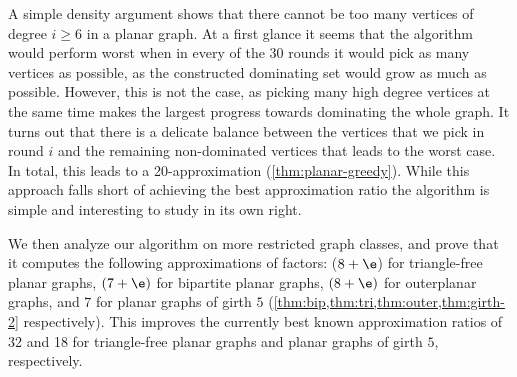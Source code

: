 A simple density argument shows
that there cannot be too many vertices of degree $i\geq 6$ in a planar
graph. At a first glance it seems that the algorithm would perform worst
when in every of the $30$ rounds it would pick as many vertices as possible,
as the constructed dominating set would grow as much as possible. However,
this is not the case, as picking many high degree vertices at the same time makes
the largest progress towards dominating the whole graph. It turns
out that there is a delicate balance between the vertices that we pick
in round $i$ and the remaining non-dominated vertices that leads
to the worst case. 
In total, this
leads to a 20\hspace{1pt}-\hspace{1pt}approximation (\cref{thm:planar-greedy}).
While this approach falls short of achieving the best approximation ratio
the algorithm is simple and interesting to study in its own right.

\smallskip
We then analyze our algorithm on more restricted graph classes, and prove that
it computes the following approximations of factors: ($8+\e$) for triangle-free
planar graphs, $(7+\e)$ for bipartite planar graphs, $(8+\e)$ for outerplanar
graphs, and $7$ for planar graphs of girth $5$
(\cref{thm:bip,thm:tri,thm:outer,thm:girth-2} respectively).
This
improves the currently best known approximation ratios of 32
and 18 for triangle-free planar graphs and planar graphs of girth $5$,
respectively. %






%
